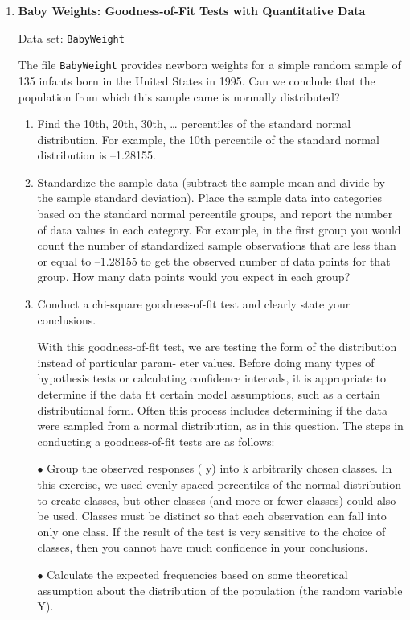 \documentclass[
]{report}
\begin{document}
\begin{enumerate}
  \item \textbf{Baby Weights: Goodness-of-Fit Tests with Quantitative Data}    

  Data set: \texttt{BabyWeight}    
  
  The file \texttt{BabyWeight} provides newborn weights for a simple random sample of 135 infants born in the United States in 1995. Can we conclude that the population from which this sample came is normally distributed?  
  \begin{enumerate}
    \item Find the 10th, 20th, 30th, … percentiles of the standard normal distribution. For example, the 10th percentile of the standard normal distribution is –1.28155.
    \item Standardize the sample data (subtract the sample mean and divide by the sample standard deviation). Place the sample data into categories based on the standard normal percentile groups, and report the number of data values in each category. For example, in the first group you would count the number of standardized sample observations that are less than or equal to –1.28155 to get the observed number of data points for that group. How many data points would you expect in each group?
    \item Conduct a chi-square goodness-of-fit test and clearly state your conclusions.
    
    With this goodness-of-fit test, we are testing the form of the distribution instead of particular param-
eter values. Before doing many types of hypothesis tests or calculating confidence intervals, it is
appropriate to determine if the data fit certain model assumptions, such as a certain distributional
form. Often this process includes determining if the data were sampled from a normal distribution, as
in this question. The steps in conducting a goodness-of-fit tests are as follows:
  
  $\bullet$ Group the observed responses ( y) into k arbitrarily chosen classes. In this exercise, we used evenly
  spaced percentiles of the normal distribution to create classes, but other classes (and more or fewer
  classes) could also be used. Classes must be distinct so that each observation can fall into only one
  class. If the result of the test is very sensitive to the choice of classes, then you cannot have much
  confidence in your conclusions.
  
  $\bullet$ Calculate the expected frequencies based on some theoretical assumption about the distribution of
  the population (the random variable Y).
  

\end{enumerate}
\end{enumerate}
\end{document}
